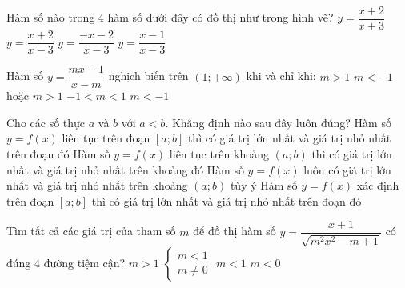 \begin{ex}%
	\immini
	{Hàm số nào trong $4$ hàm số dưới đây có đồ thị như trong hình vẽ?
	\haicot
	{$y=\dfrac{x+2}{x+3}$}
	{\True $y=\dfrac{x+2}{x-3}$}
	{$y=\dfrac{-x-2}{x-3}$}
	{$y=\dfrac{x-1}{x-3}$}}
{
}
\end{ex}
\begin{ex}%
	Hàm số $ y=\dfrac{mx-1}{x-m} $ nghịch biến trên $ (1;+\infty) $ khi và chỉ khi:
	\choice
	{$ m>1 $}
	{\True $ m<-1 $ hoặc $ m>1 $}
	{$ -1<m<1 $}
	{$ m<-1 $}
\end{ex}
\begin{ex}%
	Cho các số thực $ a $ và $ b $ với $ a<b $. Khẳng định nào sau đây luôn đúng?
	\choice
	{\True Hàm số $ y=f(x) $ liên tục trên đoạn $ [a;b] $ thì có giá trị lớn nhất và giá trị nhỏ nhất trên đoạn đó}
	{Hàm số $ y=f(x) $ liên tục trên khoảng $ (a;b) $ thì có giá trị lớn nhất và giá trị nhỏ nhất trên khoảng đó} 
	{Hàm số $ y=f(x) $ luôn có giá trị lớn nhất và giá trị nhỏ nhất trên khoảng $ (a;b) $ tùy ý}
	{Hàm số $ y=f(x) $ xác định trên đoạn $ [a;b] $ thì có giá trị lớn nhất và giá trị nhỏ nhất trên đoạn đó}
	\loigiai{}
\end{ex}

\begin{ex}%
	Tìm tất cả các giá trị của tham số $ m $ để đồ thị hàm số $ y=\dfrac{x+1}{\sqrt{m^2x^2-m+1}} $ có đúng $ 4 $ đường tiệm cận?
	\choice
	{\True $ m>1 $}
	{$ \begin{cases}
		m<1\\m \neq 0
		\end{cases} $}
	{$ m<1 $}
	{$ m<0 $}
\end{ex}

